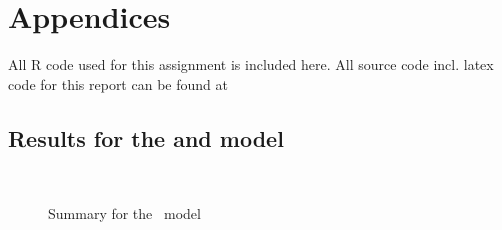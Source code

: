 \FloatBarrier

\pagebreak

\renewcommand\thesection{\Alph{section}}
\section{Appendices}

All R code used for this assignment is included here. All source code incl.
latex code for this report can be found at \githuburl


%

\subsection{Results for the \mten and \meleven model}\label{app:m10-m11}
\begin{figure}[!htb]
    \centering
    \mbox{ \quad 
          }
    \parbox{.8\textwidth}{}
    \caption{Summary for the \mten\ model}
    \label{fig:m10-summary}
\end{figure}
